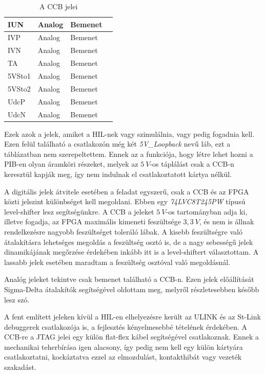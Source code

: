 \begin{table}[]
\begin{tabular}{|l|l|l|l|}
IUN            & Analog       & Bemenet      &                                 \\ \hline
IVP            & Analog       & Bemenet      &                                 \\ \hline
IVN            & Analog       & Bemenet      &                                 \\ \hline
TA             & Analog       & Bemenet      &                                 \\ \hline
5VSto1         & Analog       & Bemenet      &                                 \\ \hline
5VSto2         & Analog       & Bemenet      &                                 \\ \hline
UdcP           & Analog       & Bemenet      &                                 \\ \hline
UdcN           & Analog       & Bemenet      &                                 \\ \hline
\end{tabular}
\caption{A CCB jelei}
\label{tab:ccbsignals}
\end{table}

Ezek azok a jelek, amiket a HIL-nek vagy szimulálnia, vagy pedig fogadnia kell. Ezen felül található a csatlakozón még két \emph{5V\_Loopback} nevű láb, ezt a táblázatban nem szerepeltettem. Ennek az a funkciója, hogy létre lehet hozni a PIB-en olyan áramköri részeket, melyek az $5\ V$-os táplálást csak a CCB-n keresztül kapják meg, így nem indulnak el csatlakoztatott kártya nélkül.

A digitális jelek átvitele esetében a feladat egyszerű, csak a CCB és az FPGA közti jelszint különbséget kell megoldani. Ebben egy \emph{74LVC8T245PW} típusú level-shifter lesz segítségünkre. A CCB a jeleket $5\ V$-os tartományban adja ki, illetve fogadja, az FPGA maximális kimeneti feszültsége $3,3\ V$, és nem is állnak rendelkezésre nagyobb feszültséget toleráló lábak. A kisebb feszültségre való átalakításra lehetséges megoldás a feszültség osztó is, de a nagy sebességű jelek dinamikájának megőrzése érdekében inkább itt is a level-shiftert választottam. A lassabb jelek esetében maradtam a feszültség osztóval való megoldásnál.

Analóg jeleket tekintve csak bemenet található a CCB-n. Ezen jelek előállítását Sigma-Delta átalakítók segítségével oldottam meg, melyről részletesebben később lesz szó.

A fent említett jeleken kívül a HIL-en elhelyezésre került az ULINK és az St-Link debuggerek csatlakozója is, a fejlesztés kényelmesebbé tételének érdekében. A CCB-re a JTAG jelei egy külön flat-flex kábel segítségével csatlakoznak. Ennek a mechanikai teherbírása igen alacsony, így pedig nem kell egy külön kártyára csatlakoztatni, kockáztatva ezzel az elmozdulást, kontakthibát vagy vezeték szakadást.

